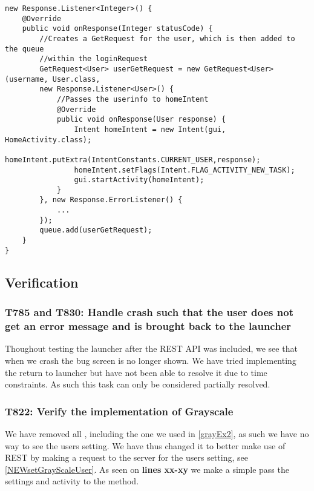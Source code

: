\begin{minipage}[H]{\linewidth}
\begin{lstlisting}[caption = If the user information is authenticated we proceed
with a request for user, label = userReq] new Response.Listener<Integer>() {
	@Override
    public void onResponse(Integer statusCode) {
    	//Creates a GetRequest for the user, which is then added to the queue
    	//within the loginRequest 
    	GetRequest<User> userGetRequest = new GetRequest<User>(username, User.class, 
    	new Response.Listener<User>() {
        	//Passes the userinfo to homeIntent
            @Override
            public void onResponse(User response) {
            	Intent homeIntent = new Intent(gui, HomeActivity.class);
                homeIntent.putExtra(IntentConstants.CURRENT_USER,response);
                homeIntent.setFlags(Intent.FLAG_ACTIVITY_NEW_TASK);
                gui.startActivity(homeIntent);
            }
        }, new Response.ErrorListener() {
			...
        });
        queue.add(userGetRequest);
	}
}
\end{lstlisting}
\end{minipage}




\subsection{Verification}

\subsubsection{T785 and T830: Handle crash such that the user does not get an
error message and is brought back to the launcher}
Thoughout testing the launcher after the REST API was included, we see that when
we crash the bug screen is no longer shown. We have tried implementing the
return to launcher but have not been able to resolve it due to time constraints.
As such this task can only be considered partially resolved.

\subsubsection{T822: Verify the implementation of Grayscale}
We have removed all , including the one we used in
\autoref{grayEx2}, as such we have no way to see the users setting. We have thus
changed it to better make use of REST by making a request to the server for the
users setting, see \autoref{NEWsetGrayScaleUser}. As seen on \textbf{lines
xx-xy} we make a simple  pass the settings and activity to the
 method.\nl

